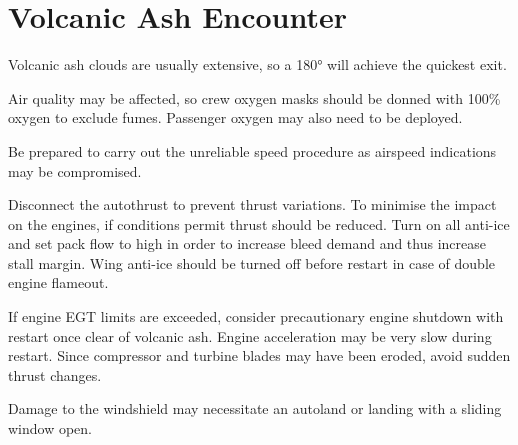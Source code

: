 \documentclass[a5paper,11pt,twoside]{book}
\newcommand{\multicite}[1]{
  \nopagebreak
  \noindent{\footnotesize\color{blue}{[ #1 ]}}
}
\begin{document}
\section{Volcanic Ash Encounter}

Volcanic ash clouds are usually extensive, so a 180° will achieve the quickest exit.

Air quality may be affected, so crew oxygen masks should be donned with 100\%
oxygen to exclude fumes. Passenger oxygen may also need to be deployed.

Be prepared to carry out the unreliable speed procedure as airspeed indications
may be compromised.

Disconnect the autothrust to prevent thrust variations. To minimise the impact
on the engines, if conditions permit thrust should be reduced. Turn on all
anti-ice and set pack flow to high in order to increase bleed demand and thus
increase stall margin. Wing anti-ice should be turned off before restart in case
of double engine flameout.

If engine EGT limits are exceeded, consider precautionary engine shutdown with
restart once clear of volcanic ash. Engine acceleration may be very slow during
restart. Since compressor and turbine blades may have been eroded, avoid sudden
thrust changes.

Damage to the windshield may necessitate an autoland or landing with a sliding
window open.

\multicite{QRH AEP.MISC, FCOM PRO.AEP.MISC, FCTM PRO.AEP.MISC}
\end{document}
